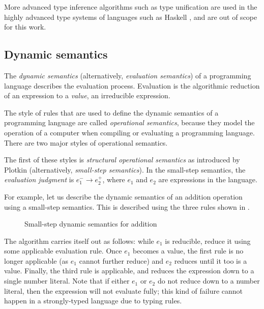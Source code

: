 More advanced type inference algorithms such as type unification are used in the highly advanced type systems of languages such as Haskell \cite{gundry2013type}, and are out of scope for this work.

\subsection{Dynamic semantics}
\label{sec:dynamic-semantics}

The \textit{dynamic semantics} (alternatively, \textit{evaluation semantics}) of a programming language describes the evaluation process. Evaluation is the algorithmic reduction of an expression to a \textit{value}, an irreducible expression.

The style of rules that are used to define the dynamic semantics of a programming language are called \textit{operational semantics}, because they model the operation of a computer when compiling or evaluating a programming language. There are two major styles of operational semantics.

The first of these styles is \textit{structural operational semantics} as introduced by Plotkin \cite{plotkin1981structural} (alternatively, \textit{small-step semantics}). In the small-step semantics, the \textit{evaluation judgment} is $e_1^-\to e_2^+$, where $e_1$ and $e_2$ are expressions in the language.

For example, let us describe the dynamic semantics of an addition operation using a small-step semantics. This is described using the three rules shown in .

\begin{figure}
  \centering
  \begin{mdframed}
    \begin{singlespace}
    \end{singlespace}
  \end{mdframed}
  \caption{Small-step dynamic semantics for addition}
  \label{fig:small-step-addition}
\end{figure}

The algorithm carries itself out as follows: while $e_1$ is reducible, reduce it using some applicable evaluation rule. Once $e_1$ becomes a value, the first rule is no longer applicable (as $e_1$ cannot further reduce) and $e_2$ reduces until it too is a value. Finally, the third rule is applicable, and reduces the expression down to a single number literal. Note that if either $e_1$ or $e_2$ do not reduce down to a number literal, then the expression will not evaluate fully; this kind of failure cannot happen in a strongly-typed language due to typing rules.

